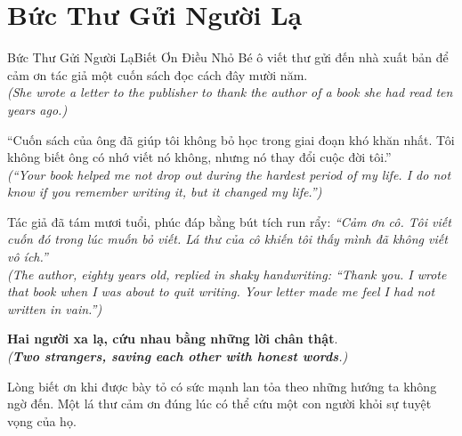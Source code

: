\section{Bức Thư Gửi Người Lạ}
\begin{truyen}{Bức Thư Gửi Người Lạ}{Biết Ơn Điều Nhỏ Bé}
ô viết thư gửi đến nhà xuất bản để cảm ơn tác giả một cuốn sách đọc cách đây mười năm.\\
\textit{(She wrote a letter to the publisher to thank the author of a book she had read ten years ago.)}

``Cuốn sách của ông đã giúp tôi không bỏ học trong giai đoạn khó khăn nhất. Tôi không biết ông có nhớ viết nó không, nhưng nó thay đổi cuộc đời tôi.''\\
\textit{(``Your book helped me not drop out during the hardest period of my life. I do not know if you remember writing it, but it changed my life.'')}

Tác giả đã tám mươi tuổi, phúc đáp bằng bút tích run rẩy: \textit{``Cảm ơn cô. Tôi viết cuốn đó trong lúc muốn bỏ viết. Lá thư của cô khiến tôi thấy mình đã không viết vô ích.''}\\
\textit{(The author, eighty years old, replied in shaky handwriting: \textit{``Thank you. I wrote that book when I was about to quit writing. Your letter made me feel I had not written in vain.''})}

\textbf{Hai người xa lạ, cứu nhau bằng những lời chân thật}.\\
\textit{(\textbf{Two strangers, saving each other with honest words}.)}
\end{truyen}
\begin{baihoc}
  Lòng biết ơn khi được bày tỏ có sức mạnh lan tỏa theo những hướng ta không ngờ đến. Một lá thư cảm ơn đúng lúc có thể cứu một con người khỏi sự tuyệt vọng của họ.
\end{baihoc}

